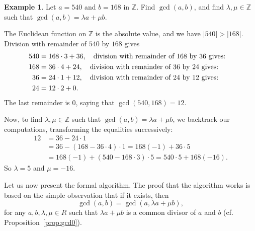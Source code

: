 \documentclass[12pt]{article}
\newcommand{\qbox}[1]{\quad\hbox{#1}\quad}
\theoremstyle{definition}
\newtheorem{example}[thm]{Example}
\newcounter{ex}\renewcommand\theex{\arabic{ex}}
\newcommand{\Z}{\ensuremath{\mathbb{Z}}}
\begin{document}
\begin{example}\label{ex:ea-z}
Let $a=540$ and $b=168$ in $\Z$. Find $\gcd(a,b)$, and find
$\lambda,\mu\in\Z$ such that $\gcd(a,b)=\lambda a+\mu b$.


The Euclidean function on $\Z$ is the absolute value, and we have
$|540|>|168|$. Division with remainder of $540$ by $168$ gives
\begin{align*}
540&=168\cdot3+36,\qbox{division with remainder of $168$ by $36$ gives:}\\
168&=36\cdot4+24,\qbox{division with remainder of $36$ by $24$ gives:}\\
36&=24\cdot1+12,\qbox{division with remainder of $24$ by $12$ gives:}\\
24&=12\cdot2+0.
\end{align*}
The last remainder is $0$, saying that $\gcd(540,168)=12$.

Now, to find $\lambda,\mu\in\Z$ such that $\gcd(a,b)=\lambda a+\mu b$,
we backtrack our computations, transforming the equalities successively:
\begin{align*}
12&=36-24\cdot1\\
&=36-(168-36\cdot4)\cdot1=168(-1)+36\cdot5\\
&=168(-1)+(540-168\cdot3)\cdot5=
540\cdot5+168(-16).
\end{align*}
So $\lambda=5$ and $\mu=-16$.

\end{example}

Let us now present the formal algorithm. The proof that the algorithm
works is based on the simple observation that if it exists, then
$$\gcd(a,b)=\gcd(a,\lambda a+\mu b),$$
for any $a,b,\lambda,\mu\in R$ such that $\lambda a+\mu b$ is a common
divisor of $a$ and $b$ (cf. Proposition~\ref{prop:gcd0}).
\end{document}
